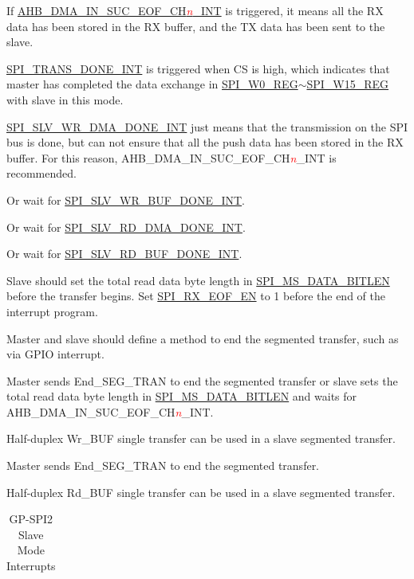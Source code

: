 \documentclass[main\_\_EN.tex]{subfiles}
\begin{document}
\begin{ThreePartTable}

\begin{TableNotes}
    \item[1] If \hyperref[int:GDMAINSUCEOFINT]{AHB\_DMA\_IN\_SUC\_EOF\_CH\textcolor{red}{\it{n}}\_INT} is triggered, it means all the RX data has been stored in the RX buffer, and the TX data has been sent to the slave.
    \item[2] \hyperref[int:SPITRANSDONEINT]{SPI\_TRANS\_DONE\_INT} is triggered when CS is high, which indicates that master has completed the data exchange in \hyperref[regdesc:SPIW0REG]{SPI\_W0\_REG}$\sim$\hyperref[regdesc:SPIW15REG]{SPI\_W15\_REG} with slave in this mode.
    \item[3] \hyperref[int:SPISLVWRDMADONEINT]{SPI\_SLV\_WR\_DMA\_DONE\_INT} just means that the transmission on the SPI bus is done, but can not ensure that all the push data has been stored in the RX buffer. For this reason, AHB\_DMA\_IN\_SUC\_EOF\_CH\textcolor{red}{\it{n}}\_INT is recommended.
    \item[4] Or wait for \hyperref[int:SPISLVWRBUFDONEINT]{SPI\_SLV\_WR\_BUF\_DONE\_INT}.
    \item[5] Or wait for \hyperref[int:SPISLVRDDMADONEINT]{SPI\_SLV\_RD\_DMA\_DONE\_INT}.
    \item[6] Or wait for \hyperref[int:SPISLVRDBUFDONEINT]{SPI\_SLV\_RD\_BUF\_DONE\_INT}.
    \item[7] Slave should set the total read data byte length in \hyperref[fielddesc:SPIMSDATABITLEN]{SPI\_MS\_DATA\_BITLEN} before the transfer begins. Set \hyperref[fielddesc:SPIRXEOFEN]{SPI\_RX\_EOF\_EN} to 1 before the end of the interrupt program.
    \item[8] Master and slave should define a method to end the segmented transfer, such as via GPIO interrupt.
    \item[9] Master sends End\_SEG\_TRAN to end the segmented transfer or slave sets the total read data byte length in \hyperref[fielddesc:SPIMSDATABITLEN]{SPI\_MS\_DATA\_BITLEN} and waits for AHB\_DMA\_IN\_SUC\_EOF\_CH\textcolor{red}{\it{n}}\_INT.
    \item[10] Half-duplex Wr\_BUF single transfer can be used in a slave segmented transfer.
    \item[11] Master sends End\_SEG\_TRAN to end the segmented transfer.
    \item[12] Half-duplex Rd\_BUF single transfer can be used in a slave segmented transfer.
\end{TableNotes}
\begin{longtable}[c]{|l|l|l|l|}
\caption{GP-SPI2 Slave Mode Interrupts}
\label{tab:slave-interrupts}
\\\hline


\end{longtable}
\end{ThreePartTable}
\end{document}
